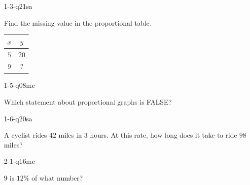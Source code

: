 
\begin{practiceQuestion}{1-3-q21}{sa}
\begin{questionText}
Find the missing value in the proportional table.

\begin{center}
\begin{tabular}{|c|c|}
\hline $x$ & $y$ \\ \hline $5$ & $20$ \\ $9$ & $?$ \\ \hline
\end{tabular}
\end{center}
\end{questionText}
\end{practiceQuestion}

\begin{practiceQuestion}{1-5-q08}{mc}
\begin{questionText}
Which statement about proportional graphs is FALSE?
\end{questionText}
\end{practiceQuestion}

\begin{practiceQuestion}{1-6-q20}{sa}
\begin{questionText}
A cyclist rides $42$ miles in $3$ hours. At this rate, how long does it take to ride $98$ miles?
\end{questionText}
\end{practiceQuestion}

\begin{practiceQuestion}{2-1-q16}{mc}
\begin{questionText}
$9$ is $12\%$ of what number?
\end{questionText}
\end{practiceQuestion}

